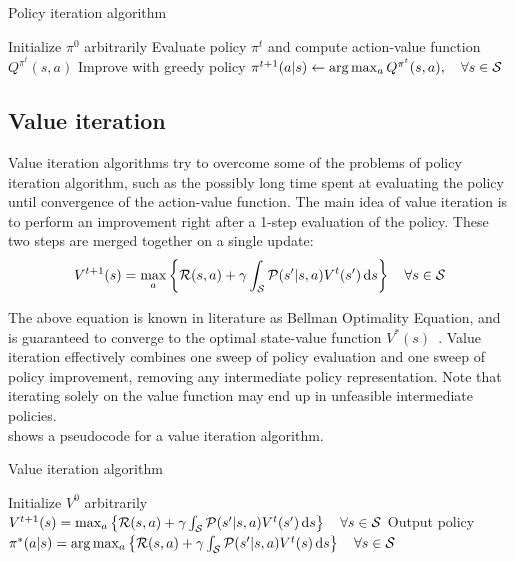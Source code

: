 \begin{algorithm}[t]
\caption{Policy iteration algorithm}\label{alg:policy-iteration}
\begin{algorithmic}
\State Initialize $\pi^0$ arbitrarily
\State Evaluate policy $\pi^t$ and compute action-value function $Q^{\pi^t}(s,a)$
\State Improve with greedy policy $\pi^{t+1}(a|s) \gets \arg\max_a{Q^{\pi^t}(s,a)},\quad\forall s\in\mathcal{S}$
\EndFor
\end{algorithmic}
\end{algorithm}

\subsection{Value iteration}
Value iteration algorithms try to overcome some of the problems of policy iteration algorithm, such as the possibly long time spent at evaluating the policy until convergence of the action-value function. The main idea of value iteration is to perform an improvement right after a 1-step evaluation of the policy. These two steps are merged together on a single update:
\[
V^{t+1}(s) = \max_a \left\{ \mathcal{R}(s,a) + \gamma\int_{\mathcal{S}} \mathcal{P}(s'|s,a)V^{t}(s')\, \textrm{d} s \right\}\quad\forall s \in \mathcal{S}
\] 

The above equation is known in literature as Bellman Optimality Equation, and is guaranteed to converge to the optimal state-value function $V^*(s)$~\cite{BELLMAN1958228}. Value iteration effectively combines one sweep of policy evaluation and one sweep of policy improvement, removing any intermediate policy representation. Note that iterating solely on the value function may end up in unfeasible intermediate policies.\\
 shows a pseudocode for a value iteration algorithm.

\begin{algorithm}[t]
\caption{Value iteration algorithm}\label{alg:value-iteration}
\begin{algorithmic}
\State Initialize $V^0$ arbitrarily
\State $V^{t+1}(s) = \max_a \left\{ \mathcal{R}(s,a) + \gamma\int_{\mathcal{S}} \mathcal{P}(s'|s,a)V^{t}(s')\, \textrm{d} s \right\}\quad\forall s \in \mathcal{S}$
\EndFor
\State Output policy $\pi^*(a|s)=\arg\max_a\left\{ \mathcal{R}(s,a) + \gamma\int_{\mathcal{S}}\mathcal{P}(s'|s,a)V^t(s) \, \textrm{d} s\right\}\quad\forall s\in\mathcal{S}$
\end{algorithmic}
\end{algorithm}

